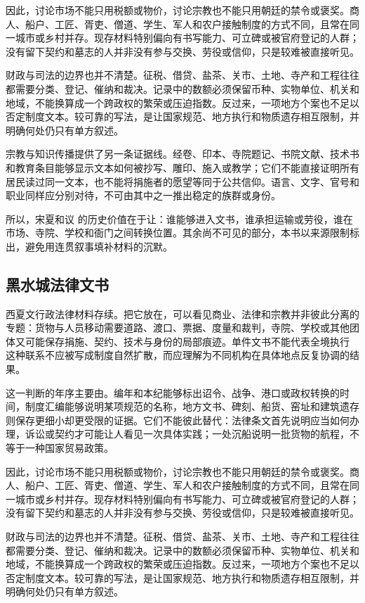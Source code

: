 因此，讨论市场不能只用税额或物价，讨论宗教也不能只用朝廷的禁令或褒奖。商人、船户、工匠、胥吏、僧道、学生、军人和农户接触制度的方式不同，且常在同一城市或乡村并存。现存材料特别偏向有书写能力、可立碑或被官府登记的人群；没有留下契约和墓志的人并非没有参与交换、劳役或信仰，只是较难被直接听见。

财政与司法的边界也并不清楚。征税、借贷、盐茶、关市、土地、寺产和工程往往都需要分类、登记、催纳和裁决。记录中的数额必须保留币种、实物单位、机关和地域，不能换算成一个跨政权的繁荣或压迫指数。反过来，一项地方个案也不足以否定制度文本。较可靠的写法，是让国家规范、地方执行和物质遗存相互限制，并明确何处仍只有单方叙述。

宗教与知识传播提供了另一条证据线。经卷、印本、寺院题记、书院文献、技术书和教育条目能够显示文本如何被抄写、雕印、施入或教学；它们不能直接证明所有居民读过同一文本，也不能将捐施者的愿望等同于公共信仰。语言、文字、官号和职业同样应分别对待，不可由其中之一推出稳定的族群或身份。

所以，宋夏和议 的历史价值在于让：谁能够进入文书，谁承担运输或劳役，谁在市场、寺院、学校和衙门之间转换位置。其余尚不可见的部分，本书以来源限制标出，避免用连贯叙事填补材料的沉默。

\subsection{黑水城法律文书}

西夏文行政法律材料存续。把它放在，可以看见商业、法律和宗教并非彼此分离的专题：货物与人员移动需要道路、渡口、票据、度量和裁判，寺院、学校或其他团体又可能保存捐施、契约、技术与身份的局部痕迹。单件文书不能代表全境执行 这种联系不应被写成制度自然扩散，而应理解为不同机构在具体地点反复协调的结果。

这一判断的年序主要由。编年和本纪能够标出诏令、战争、港口或政权转换的时间，制度汇编能够说明某项规范的名称，地方文书、碑刻、船货、窑址和建筑遗存则保存更细小却更受限的证据。它们不能彼此替代：法律条文首先说明应当如何办理，诉讼或契约才可能让人看见一次具体实践；一处沉船说明一批货物的航程，不等于一种国家贸易政策。

因此，讨论市场不能只用税额或物价，讨论宗教也不能只用朝廷的禁令或褒奖。商人、船户、工匠、胥吏、僧道、学生、军人和农户接触制度的方式不同，且常在同一城市或乡村并存。现存材料特别偏向有书写能力、可立碑或被官府登记的人群；没有留下契约和墓志的人并非没有参与交换、劳役或信仰，只是较难被直接听见。

财政与司法的边界也并不清楚。征税、借贷、盐茶、关市、土地、寺产和工程往往都需要分类、登记、催纳和裁决。记录中的数额必须保留币种、实物单位、机关和地域，不能换算成一个跨政权的繁荣或压迫指数。反过来，一项地方个案也不足以否定制度文本。较可靠的写法，是让国家规范、地方执行和物质遗存相互限制，并明确何处仍只有单方叙述。


